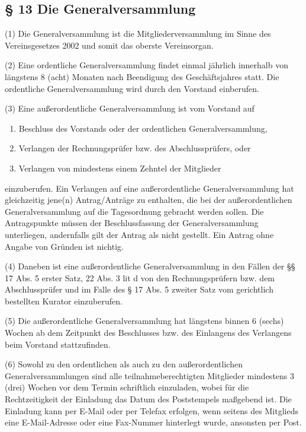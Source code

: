 \documentclass[11pt,a4paper]{article}
\begin{document}
\subsection{§ 13
Die Generalversammlung}

(1)
Die Generalversammlung ist die Mitgliederversammlung im Sinne des Vereinsgesetzes 2002 und somit das oberste Vereinsorgan.

(2)
Eine ordentliche Generalversammlung findet einmal jährlich innerhalb von längstens 8 (acht) Monaten nach Beendigung des Geschäftsjahres statt.
Die ordentliche Generalversammlung wird durch den Vorstand einberufen.

(3)
Eine außerordentliche Generalversammlung ist vom Vorstand auf

\begin{enumerate}[label=\alph*)]
\item
Beschluss des Vorstands oder der ordentlichen Generalversammlung,
\item
Verlangen der Rechnungsprüfer bzw. des Abschlussprüfers, oder
\item
Verlangen von mindestens einem Zehntel der Mitglieder
\end{enumerate}

einzuberufen.
Ein Verlangen auf eine außerordentliche Generalversammlung hat gleichzeitig jene(n) Antrag/Anträge zu enthalten, die bei der außerordentlichen Generalversammlung auf die Tagesordnung gebracht werden sollen.
Die Antragspunkte müssen der Beschlussfassung der Generalversammlung unterliegen, andernfalls gilt der Antrag als nicht gestellt.
Ein Antrag ohne Angabe von Gründen ist nichtig.

(4)
Daneben ist eine außerordentliche Generalversammlung in den Fällen der §§ 17 Abs. 5 erster Satz, 22 Abs. 3 lit d von den Rechnungsprüfern bzw. dem Abschlussprüfer und im Falle des § 17 Abs. 5 zweiter Satz vom gerichtlich bestellten Kurator einzuberufen.

(5)
Die außerordentliche Generalversammlung hat längstens binnen 6 (sechs) Wochen ab dem Zeitpunkt des Beschlusses bzw. des Einlangens des Verlangens beim Vorstand stattzufinden.

(6)
Sowohl zu den ordentlichen als auch zu den außerordentlichen Generalversammlungen sind alle teilnahmeberechtigten Mitglieder mindestens 3 (drei) Wochen vor dem Termin schriftlich einzuladen, wobei für die Rechtzeitigkeit der Einladung das Datum des Poststempels maßgebend ist.
Die Einladung kann per E-Mail oder per Telefax erfolgen, wenn seitens des Mitglieds eine E-Mail-Adresse oder eine Fax-Nummer hinterlegt wurde, ansonsten per Post.
\end{document}
